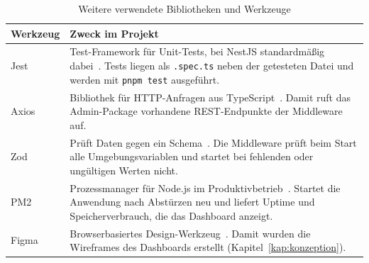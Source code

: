 \begin{table}[htbp]
  \centering
  \small
  \begin{tabular}{p{2cm}p{10.4cm}}
    \hline
    \textbf{Werkzeug} & \textbf{Zweck im Projekt} \\
    \hline
    Jest & Test-Framework für Unit-Tests, bei NestJS standardmäßig dabei~\cite{jest,nestjs-testing}. Tests liegen als \texttt{.spec.ts} neben der getesteten Datei und werden mit \texttt{pnpm test} ausgeführt. \\
    Axios & Bibliothek für HTTP-Anfragen aus TypeScript~\cite{axios}. Damit ruft das Admin-Package vorhandene REST-Endpunkte der Middleware auf. \\
    Zod & Prüft Daten gegen ein Schema~\cite{zod}. Die Middleware prüft beim Start alle Umgebungsvariablen und startet bei fehlenden oder ungültigen Werten nicht. \\
    PM2 & Prozessmanager für Node.js im Produktivbetrieb~\cite{pm2}. Startet die Anwendung nach Abstürzen neu und liefert Uptime und Speicherverbrauch, die das Dashboard anzeigt. \\
    Figma & Browserbasiertes Design-Werkzeug~\cite{figma}. Damit wurden die Wireframes des Dashboards erstellt (Kapitel~\ref{kap:konzeption}). \\
    \hline
  \end{tabular}
  \caption{Weitere verwendete Bibliotheken und Werkzeuge}
  \label{tab:werkzeuge}
\end{table}
